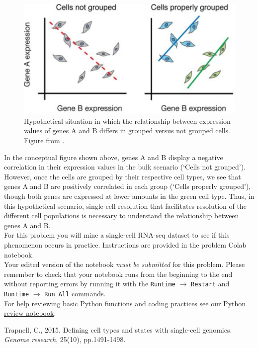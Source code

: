 \documentclass[11pt]{exam}
\begin{document}
\begin{questions}
  \begin{figure}[!hb]
        \centering
        \includegraphics[scale=0.5]{Figures/groupings.png}
        \caption{Hypothetical situation in which the relationship between expression values of genes A and B differs in grouped versus not grouped cells. Figure from \cite{Trapnell2015}. }
    \end{figure}
 
 In the conceptual figure shown above, genes A and B display a negative correlation in their expression values in the bulk scenario (`Cells not grouped'). However, once the cells are grouped by their respective cell types, we see that genes A and B are positively correlated in each group (`Cells properly grouped'), though both genes are expressed at lower amounts in the green cell type. Thus, in this hypothetical scenario, single-cell resolution that facilitates resolution of the different cell populations is necessary to understand the relationship between genes A and B. \\
 
 For this problem you will mine a single-cell RNA-seq dataset to see if this phenomenon occurs in practice. Instructions are provided in the problem Colab notebook.\\

Your edited version of the notebook \textit{must be submitted } for this problem. Please remember to check that your notebook runs from the beginning to the end without reporting errors by running it with the {\tt Runtime} $\xrightarrow{}$ {\tt Restart} and {\tt Runtime} $\xrightarrow{}$ {\tt Run All} commands.\\


For help reviewing basic Python functions and coding practices see our \href{https://github.com/pachterlab/Bi-BE-CS-183-2023/blob/main/HW1/pythonReview.ipynb}{Python review notebook}.  \\



\end{questions}
\begin{thebibliography}{1}
Trapnell, C., 2015. Defining cell types and states with single-cell genomics. {\it Genome research}, 25(10), pp.1491-1498.
\end{thebibliography}
\end{document}
